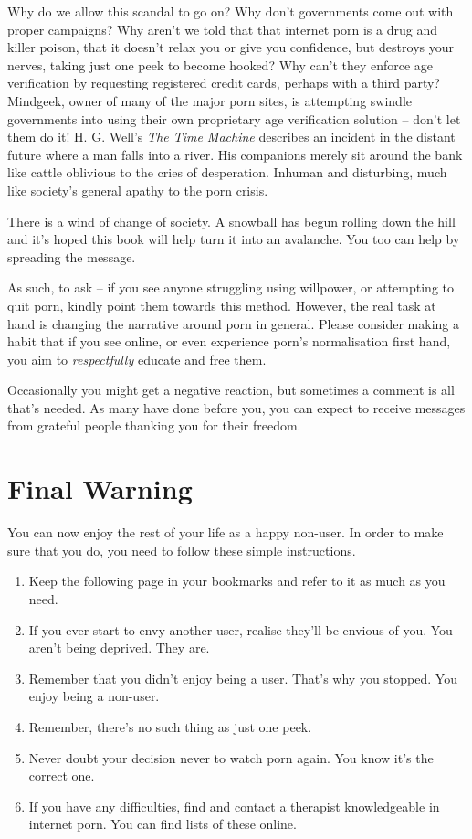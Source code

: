 \documentclass[
]{book}
\begin{document}
Why do we allow this scandal to go on? Why don't governments come out with proper campaigns? Why aren't we told that that internet porn is a drug and killer poison, that it doesn't relax you or give you confidence, but destroys your nerves, taking just one peek to become hooked? Why can't they enforce age verification by requesting registered credit cards, perhaps with a third party? Mindgeek, owner of many of the major porn sites, is attempting swindle governments into using their own proprietary age verification solution -- don't let them do it! H. G. Well's \emph{The Time Machine} describes an incident in the distant future where a man falls into a river. His companions merely sit around the bank like cattle oblivious to the cries of desperation. Inhuman and disturbing, much like society's general apathy to the porn crisis.

There is a wind of change of society. A snowball has begun rolling down the hill and it's hoped this book will help turn it into an avalanche. You too can help by spreading the message.

As such, to ask -- if you see anyone struggling using willpower, or attempting to quit porn, kindly point them towards this method. However, the real task at hand is changing the narrative around porn in general. Please consider making a habit that if you see online, or even experience porn's normalisation first hand, you aim to \emph{respectfully} educate and free them.

Occasionally you might get a negative reaction, but sometimes a comment is all that's needed. As many have done before you, you can expect to receive messages from grateful people thanking you for their freedom.

\hypertarget{final-warning}{%
\section{Final Warning}\label{final-warning}}

You can now enjoy the rest of your life as a happy non-user. In order to make sure that you do, you need to follow these simple instructions.

\begin{enumerate}
\def\labelenumi{\arabic{enumi}.}
\item
  Keep the following page in your bookmarks and refer to it as much as you need.
\item
  If you ever start to envy another user, realise they'll be envious of you. You aren't being deprived. They are.
\item
  Remember that you didn't enjoy being a user. That's why you stopped. You enjoy being a non-user.
\item
  Remember, there's no such thing as just one peek.
\item
  Never doubt your decision never to watch porn again. You know it's the correct one.
\item
  If you have any difficulties, find and contact a therapist knowledgeable in internet porn. You can find lists of these online.
\end{enumerate}
\end{document}

